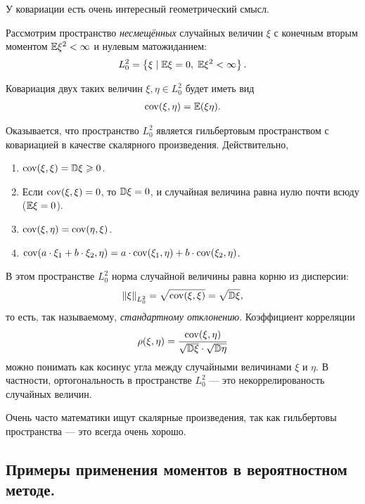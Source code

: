 \documentclass[../main.tex]{subfiles}
\begin{document}
\begin{remrk}
 У ковариации есть очень интересный геометрический смысл. 

 Рассмотрим пространство \textit{несмещённых} случайных величин $ \xi $ с конечным вторым моментом $ \mathbb E\xi^{2} < \infty $ и нулевым матожиданием:
 \begin{align*}
  L^{2}_0 = \left\{ \xi \mid \mathbb E\xi = 0,\; \mathbb E\xi^{2} < \infty \right\}.
 \end{align*}

 Ковариация двух таких величин $ \xi,\eta\in L^{2}_0 $ будет иметь вид
 \begin{align*}
  \mathrm{cov}(\xi,\eta) = \mathbb E(\xi\eta).
 \end{align*}

 Оказывается, что пространство $ L^{2}_0 $ является гильбертовым пространством с ковариацией в качестве скалярного произведения. Действительно,
 \begin{enumerate}
  \item $ \mathrm{cov}(\xi,\xi) = \mathbb D\xi \geqslant 0 $.
  \item Если $ \mathrm{cov}(\xi, \xi) = 0 $, то $ \mathbb D\xi = 0 $, и случайная величина равна нулю почти всюду ($ \mathbb E\xi = 0$).
  \item $ \mathrm{cov}(\xi,\eta) = \mathrm{cov}(\eta,\xi) $.
  \item $ \mathrm{cov}(a \cdot \xi_1 + b \cdot \xi_2, \eta) = a \cdot \mathrm{cov}(\xi_1, \eta) + b \cdot \mathrm{cov}(\xi_2,\eta) $.
 \end{enumerate}

 В этом пространстве  $ L^{2}_0 $  норма случайной величины равна корню из дисперсии:
 \begin{align*}
  \left\| \xi \right\|_{L^{2}_0} = \sqrt{\mathrm{cov}(\xi,\xi)} = \sqrt{\mathbb D\xi},
 \end{align*} то есть, так называемому, \textit{стандартному отклонению}. Коэффициент корреляции
 \begin{align*}
  \rho(\xi,\eta) = \frac{\mathrm{cov}(\xi,\eta)}{\sqrt{\mathbb D\xi} \cdot \sqrt{\mathbb D\eta}}
 \end{align*} можно понимать как косинус угла между случайными величинами $ \xi $ и $ \eta $. В частности, ортогональность в пространстве $ L^{2}_0 $ --- это некоррелированость случайных величин.

 Очень часто математики ищут скалярные произведения, так как гильбертовы пространства --- это всегда очень хорошо.

\end{remrk}

\subsection{Примеры применения моментов в вероятностном методе.}
\end{document}

